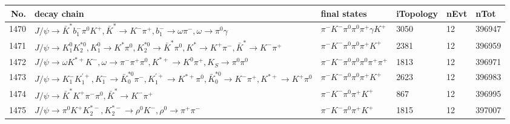 \begin{table}[htbp] 
\begin{center}
\begin{small}
\begin{tabular}{rlllll}\hline\hline
 No. & decay chain & final states &  iTopology & nEvt & nTot \\\hline
1470&$J/\psi       \rightarrow \bar{K}^{*}   b_{1}^{-}      \pi^{0}        K^{+}          , \bar{K}^{*}    \rightarrow K^{-}          \pi^{+}        , b_{1}^{-}       \rightarrow \omega         \pi^{-}        , \omega          \rightarrow \pi^{0}        \gamma       $&$\pi^{-}        K^{-}          \pi^{0}        \pi^{0}        \pi^{+}        \gamma       K^{+}          $& 3050&   12&396947\\
1471&$J/\psi       \rightarrow K_1^{0}        K_2^{*0}       , K_1^{0}         \rightarrow K^{*}          \pi^{0}        , K_2^{*0}        \rightarrow \bar{K}^{*}   \pi^{0}        , K^{*}           \rightarrow K^{+}          \pi^{-}        , \bar{K}^{*}    \rightarrow K^{-}          \pi^{+}        $&$\pi^{-}        K^{-}          \pi^{0}        \pi^{0}        \pi^{+}        K^{+}          $& 2381&   12&396959\\
1472&$J/\psi       \rightarrow \omega         K^{*+}         K^{-}          , \omega          \rightarrow \pi^{-}        \pi^{+}        \pi^{0}        , K^{*+}          \rightarrow K^{0}          \pi^{+}        , K_{S}           \rightarrow \pi^{0}        \pi^{0}        $&$\pi^{-}        K^{-}          \pi^{0}        \pi^{0}        \pi^{0}        \pi^{+}        \pi^{+}        $& 1813&   12&396971\\
1473&$J/\psi       \rightarrow K_{1}^{-}      K_1^{'+}      , K_{1}^{-}       \rightarrow \bar{K}_0^{*0}\pi^{-}        , K_1^{'+}       \rightarrow K^{*+}         \pi^{0}        , \bar{K}_0^{*0} \rightarrow K^{-}          \pi^{+}        , K^{*+}          \rightarrow K^{+}          \pi^{0}        $&$\pi^{-}        K^{-}          \pi^{0}        \pi^{0}        \pi^{+}        K^{+}          $& 2623&   12&396983\\
1474&$J/\psi       \rightarrow \bar{K}^{*}   K^{+}          \pi^{-}        \pi^{0}        , \bar{K}^{*}    \rightarrow K^{-}          \pi^{+}        $&$\pi^{-}        K^{-}          \pi^{0}        \pi^{+}        K^{+}          $&  867&   12&396995\\
1475&$J/\psi       \rightarrow \pi^{0}        K^{+}          K_2^{*-}       , K_2^{*-}        \rightarrow \rho^{0}      K^{-}          , \rho^{0}       \rightarrow \pi^{+}        \pi^{-}        $&$\pi^{-}        K^{-}          \pi^{0}        \pi^{+}        K^{+}          $& 1815&   12&397007\\

\end{tabular}
\end{small}
\end{center}
\end{table}

